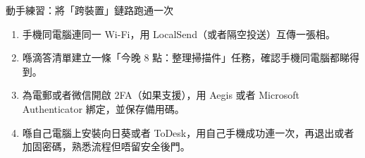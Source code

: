 \begin{tcbpractice}{動手練習：將「跨裝置」鏈路跑通一次}
\begin{enumerate}
  \item 手機同電腦連同一 Wi-Fi，用 LocalSend（或者隔空投送）互傳一張相。
  \item 喺滴答清單建立一條「今晚 8 點：整理掃描件」任務，確認手機同電腦都睇得到。
  \item 為電郵或者微信開啟 2FA（如果支援），用 Aegis 或者 Microsoft Authenticator 綁定，並保存備用碼。
  \item 喺自己電腦上安裝向日葵或者 ToDesk，用自己手機成功連一次，再退出或者加固密碼，熟悉流程但唔留安全後門。
\end{enumerate}

\end{tcbpractice}
